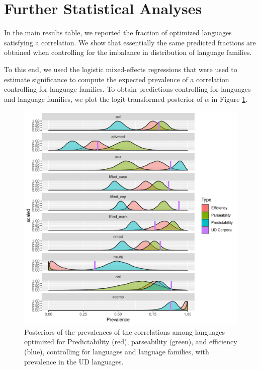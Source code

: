 \documentclass[12pt]{article}
\begin{document}
\section{Further Statistical Analyses}

In the main results table, we reported the fraction of optimized languages satisfying a correlation.
We show that essentially the same predicted fractions are obtained when controlling for the imbalance in distribution of language families.

To this end, we used the logistic mixed-effects regressions that were used to estimate significance to compute the expected prevalence of a correlation controlling for language families.
To obtain predictions controlling for languages and language families, we plot the logit-transformed posterior of $\alpha$ in Figure \ref{fig:posterior-prevalence}.



\begin{figure}
    \centering
    \includegraphics[scale=.7]{../results/correlations/figures/posterior_joint_with_ud.pdf}
	\caption{Posteriors of the prevalences of the correlations among languages optimized for Predictability (red), parseability (green), and efficiency (blue), controlling for languages and language families, with prevalence in the UD languages.}
    \label{fig:posterior-prevalence}
\end{figure}
\end{document}
